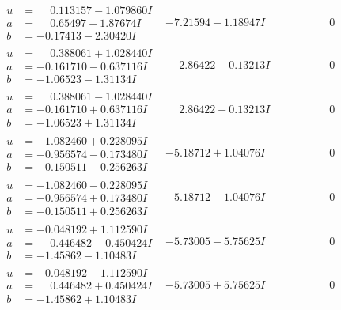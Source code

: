 \documentclass[1p]{elsarticle_modified}
\theoremstyle{definition}
\begin{document}
$$\begin{array}{c|c|c}
\begin{aligned}
u &= \phantom{-}0.113157 - 1.079860 I \\
a &= \phantom{-}0.65497 - 1.87674 I \\
b &= -0.17413 - 2.30420 I\end{aligned}
 & -7.21594 - 1.18947 I & \phantom{-0.000000 } 0 \\ \hline\begin{aligned}
u &= \phantom{-}0.388061 + 1.028440 I \\
a &= -0.161710 - 0.637116 I \\
b &= -1.06523 - 1.31134 I\end{aligned}
 & \phantom{-}2.86422 - 0.13213 I & \phantom{-0.000000 } 0 \\ \hline\begin{aligned}
u &= \phantom{-}0.388061 - 1.028440 I \\
a &= -0.161710 + 0.637116 I \\
b &= -1.06523 + 1.31134 I\end{aligned}
 & \phantom{-}2.86422 + 0.13213 I & \phantom{-0.000000 } 0 \\ \hline\begin{aligned}
u &= -1.082460 + 0.228095 I \\
a &= -0.956574 - 0.173480 I \\
b &= -0.150511 - 0.256263 I\end{aligned}
 & -5.18712 + 1.04076 I & \phantom{-0.000000 } 0 \\ \hline\begin{aligned}
u &= -1.082460 - 0.228095 I \\
a &= -0.956574 + 0.173480 I \\
b &= -0.150511 + 0.256263 I\end{aligned}
 & -5.18712 - 1.04076 I & \phantom{-0.000000 } 0 \\ \hline\begin{aligned}
u &= -0.048192 + 1.112590 I \\
a &= \phantom{-}0.446482 - 0.450424 I \\
b &= -1.45862 - 1.10483 I\end{aligned}
 & -5.73005 - 5.75625 I & \phantom{-0.000000 } 0 \\ \hline\begin{aligned}
u &= -0.048192 - 1.112590 I \\
a &= \phantom{-}0.446482 + 0.450424 I \\
b &= -1.45862 + 1.10483 I\end{aligned}
 & -5.73005 + 5.75625 I & \phantom{-0.000000 } 0 \\ \hline\begin{aligned}

\end{aligned}
\end{array}$$
\end{document}

